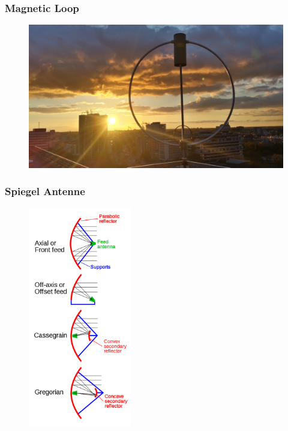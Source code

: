 \begin{frame}
  \frametitle{Magnetic Loop}
  \begin{center}
    \begin{figure}
      \includegraphics[width=1\textwidth,height=.75\textheight,keepaspectratio]{a09/Magloop.jpg}
    \end{figure}
  \end{center}
\end{frame}

\begin{frame}
  \frametitle{Spiegel Antenne}
  \begin{center}
    \begin{figure}
      \includegraphics[width=0.4\textwidth,height=.75\textheight,keepaspectratio]{a09/Parabolic_antenna_types.png}
    \end{figure}
  \end{center}
\end{frame}


